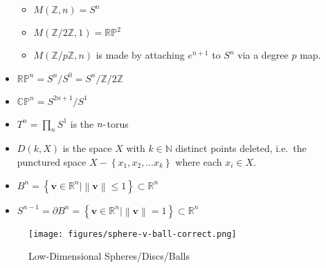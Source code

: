 \begin{itemize}
  \begin{itemize}
  \tightlist
  \item
    \(M({\mathbb{Z}}, n) = S^n\)
  \item
    \(M({\mathbb{Z}}/2{\mathbb{Z}}, 1) = {\mathbb{RP}}^2\)
  \item
    \(M({\mathbb{Z}}/p{\mathbb{Z}}, n)\) is made by attaching
    \(e^{n+1}\) to \(S^n\) via a degree \(p\) map.
  \end{itemize}
\item
  \(\mathbb{RP}^n = S^n /S^0 = S^n / {\mathbb{Z}}/2{\mathbb{Z}}\)
\item
  \(\mathbb{CP}^n = S^{2n+1} / S^1\)
\item
  \(T^n = \prod_n S^1\) is the \(n{\hbox{-}}\)torus
\item
  \(D(k, X)\) is the space \(X\) with \(k\in {\mathbb{N}}\) distinct
  points deleted, i.e.~the punctured space
  \(X - \left\{{x_1, x_2, \ldots x_k}\right\}\) where each
  \(x_i \in X\).
\item
  \(B^n = \left\{{\mathbf{v} \in {\mathbb{R}}^n \mathrel{\Big|}{\left\lVert {\mathbf{v}} \right\rVert} \leq 1}\right\} \subset {\mathbb{R}}^n\)
\item
  \(S^{n-1} = {\partial}B^{n} = \left\{{\mathbf{v} \in {\mathbb{R}}^{n} \mathrel{\Big|}{\left\lVert {\mathbf{v}} \right\rVert} = 1}\right\} \subset {\mathbb{R}}^n\)
\end{itemize}

\begin{figure}
\centering
\texttt{[image: figures/sphere-v-ball-correct.png]}
\caption{Low-Dimensional Spheres/Discs/Balls}
\end{figure}

